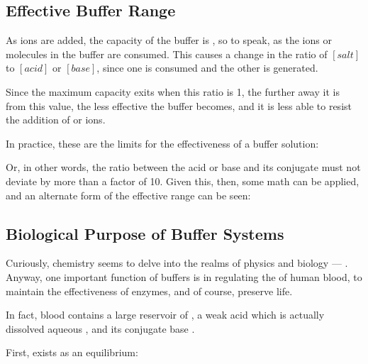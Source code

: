 

		\subsection{Effective Buffer Range}

			As  ions are added, the capacity of the buffer is , so to speak, as the ions or molecules in the buffer are
			consumed. This causes a change in the ratio of $[salt]$ to $[acid]$ or $[base]$, since one is consumed and the other is generated.

			Since the maximum capacity exits when this ratio is 1, the further away it is from this value, the less effective the buffer becomes,
			and it is less able to resist the addition of  or  ions.

			In practice, these are the limits for the effectiveness of a buffer solution:


			Or, in other words, the ratio between the acid or base and its conjugate must not deviate by more than a factor of \num{10}. Given
			this, then, some math can be applied, and an alternate form of the effective range can be seen:




		\pagebreak
		\subsection{Biological Purpose of Buffer Systems}

			Curiously, chemistry seems to delve into the realms of physics and biology --- . Anyway,
			one important function of buffers is in regulating the \pH{} of human blood, to maintain the effectiveness of enzymes, and of course,
			preserve life.

			In fact, blood contains a large reservoir of , a weak acid which is actually dissolved aqueous , and its
			conjugate base .

			First,  exists as an equilibrium:


